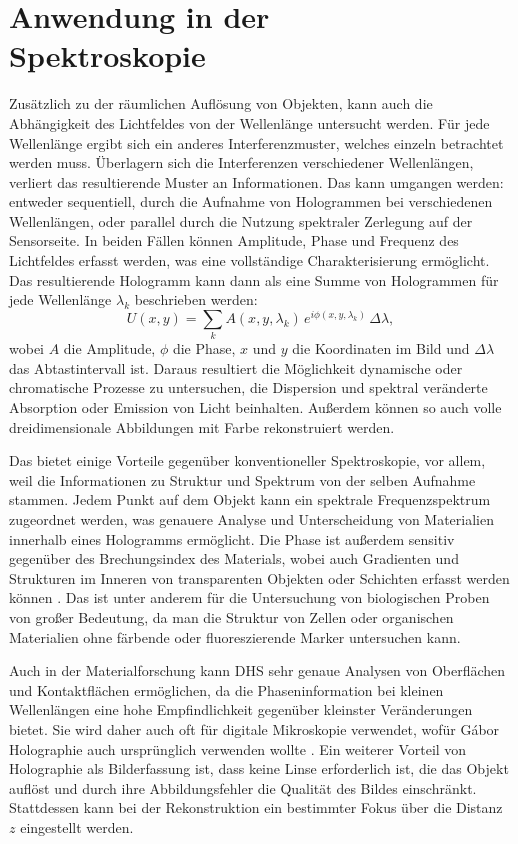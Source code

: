 \documentclass[10pt,twocolumn,a4paper]{article}
\begin{document}
\section{Anwendung in der \\Spektroskopie}
Zusätzlich zu der räumlichen Auflösung von Objekten, kann auch die Abhängigkeit des Lichtfeldes von der Wellenlänge untersucht werden. Für jede Wellenlänge ergibt sich ein anderes Interferenzmuster, welches einzeln betrachtet werden muss. Überlagern sich die Interferenzen verschiedener Wellenlängen, verliert das resultierende Muster an Informationen. Das kann umgangen werden: entweder sequentiell, durch die Aufnahme von Hologrammen bei verschiedenen Wellenlängen, oder parallel durch die Nutzung spektraler Zerlegung auf der Sensorseite. In beiden Fällen können Amplitude, Phase und Frequenz des Lichtfeldes erfasst werden, was eine vollständige Charakterisierung ermöglicht. Das resultierende Hologramm kann dann als eine Summe von Hologrammen für jede Wellenlänge $\lambda_k$ beschrieben werden:
\begin{equation}
    U(x, y) = \sum_k A(x, y, \lambda_k)\, e^{i \phi(x, y, \lambda_k)}\, \Delta\lambda,
\end{equation}
wobei $A$ die Amplitude, $\phi$ die Phase, $x$ und $y$ die Koordinaten im Bild und $\Delta\lambda$ das Abtastintervall ist.
Daraus resultiert die Möglichkeit dynamische oder chromatische Prozesse zu untersuchen, die Dispersion und spektral veränderte Absorption oder Emission von Licht beinhalten. Außerdem können so auch volle dreidimensionale Abbildungen mit Farbe rekonstruiert werden.

Das bietet einige Vorteile gegenüber konventioneller Spektroskopie, vor allem, weil die Informationen zu Struktur und Spektrum von der selben Aufnahme stammen. Jedem Punkt auf dem Objekt kann ein spektrale Frequenzspektrum zugeordnet werden, was genauere Analyse und Unterscheidung von Materialien innerhalb eines Hologramms ermöglicht. Die Phase ist außerdem sensitiv gegenüber des Brechungsindex des Materials, wobei auch Gradienten und Strukturen im Inneren von transparenten Objekten oder Schichten erfasst werden können \cite{industrial}. Das ist unter anderem für die Untersuchung von biologischen Proben von großer Bedeutung, da man die Struktur von Zellen oder organischen Materialien ohne färbende oder fluoreszierende Marker untersuchen kann. 

Auch in der Materialforschung kann DHS sehr genaue Analysen von Oberflächen und Kontaktflächen ermöglichen, da die Phaseninformation bei kleinen Wellenlängen eine hohe Empfindlichkeit gegenüber kleinster Veränderungen bietet. Sie wird daher auch oft für digitale Mikroskopie verwendet, wofür Gábor Holographie auch ursprünglich verwenden wollte \cite{DHM}. Ein weiterer Vorteil von Holographie als Bilderfassung ist, dass keine Linse erforderlich ist, die das Objekt auflöst und durch ihre Abbildungsfehler die Qualität des Bildes einschränkt. Stattdessen kann bei der Rekonstruktion ein bestimmter Fokus über die Distanz $z$ eingestellt werden.
\end{document}
